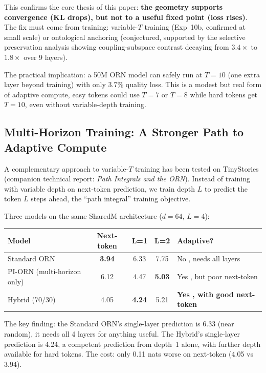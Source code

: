\documentclass[11pt, a4paper]{article}
\theoremstyle{plain}
\theoremstyle{definition}
\theoremstyle{remark}
\begin{document}
This confirms the core thesis of this paper: \textbf{the geometry supports convergence (KL drops), but not to a useful fixed point (loss rises)}.
The fix must come from training: variable-$T$ training (Exp~10b, confirmed at small scale) or ontological anchoring (conjectured, supported by the selective preservation analysis showing coupling-subspace contrast decaying from $3.4\times$ to $1.8\times$ over 9 layers).

The practical implication: a 50M ORN model can safely run at $T{=}10$ (one extra layer beyond training) with only $3.7\%$ quality loss.
This is a modest but real form of adaptive compute, easy tokens could use $T{=}7$ or $T{=}8$ while hard tokens get $T{=}10$, even without variable-depth training.

\subsection{Multi-Horizon Training: A Stronger Path to Adaptive Compute}

A complementary approach to variable-$T$ training has been tested on TinyStories (companion technical report: \textit{Path Integrals and the ORN}).
Instead of training with variable depth on next-token prediction, we train depth $L$ to predict the token $L$ steps ahead, the ``path integral'' training objective.

Three models on the same SharedM architecture ($d{=}64$, $L{=}4$):

\begin{center}\small
\begin{tabular}{@{}lcccl@{}}
\toprule
\textbf{Model} & \textbf{Next-token} & \textbf{L=1} & \textbf{L=2} & \textbf{Adaptive?} \\
\midrule
Standard ORN & \textbf{3.94} & 6.33 & 7.75 & No ,  needs all layers \\
PI-ORN (multi-horizon only) & 6.12 & 4.47 & \textbf{5.03} & Yes ,  but poor next-token \\
Hybrid (70/30) & 4.05 & \textbf{4.24} & 5.21 & \textbf{Yes ,  with good next-token} \\
\bottomrule
\end{tabular}
\end{center}

The key finding: the Standard ORN's single-layer prediction is 6.33 (near random), it needs all 4 layers for anything useful.
The Hybrid's single-layer prediction is 4.24, a competent prediction from depth~1 alone, with further depth available for hard tokens.
The cost: only 0.11 nats worse on next-token (4.05 vs 3.94).
\end{document}
